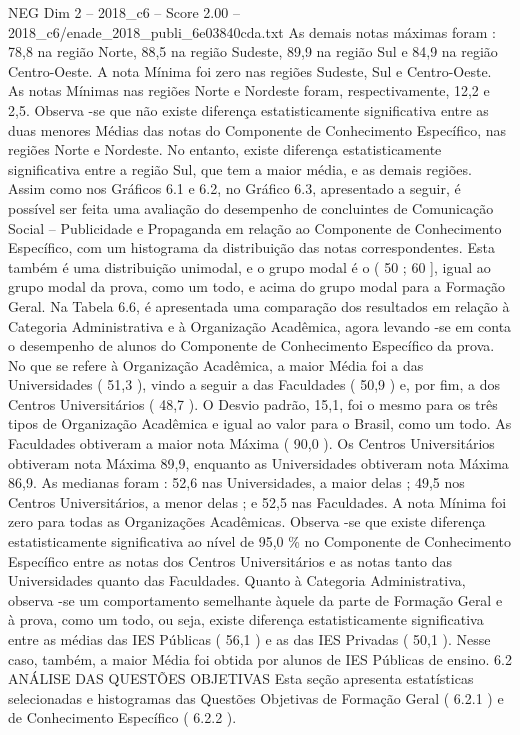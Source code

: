 \begin{textsample}{NEG Dim 2 – 2018\_c6 – Score 2.00 – 2018\_c6/enade\_2018\_publi\_6e03840cda.txt}
As demais notas máximas foram : 78,8 na região Norte, 88,5 na região Sudeste, 89,9 na região Sul e 84,9 na região Centro-Oeste.
A nota Mínima foi zero nas regiões Sudeste, Sul e Centro-Oeste.
As notas Mínimas nas regiões Norte e Nordeste foram, respectivamente, 12,2 e 2,5.
Observa -se que não existe diferença estatisticamente significativa entre as duas menores Médias das notas do Componente de Conhecimento Específico, nas regiões Norte e Nordeste.
No entanto, existe diferença estatisticamente significativa entre a região Sul, que tem a maior média, e as demais regiões.
Assim como nos Gráficos 6.1 e 6.2, no Gráfico 6.3, apresentado a seguir, é possível ser feita uma avaliação do desempenho de concluintes de Comunicação Social – Publicidade e Propaganda em relação ao Componente de Conhecimento Específico, com um histograma da distribuição das notas correspondentes.
Esta também é uma distribuição unimodal, e o grupo modal é o ( 50 ; 60 ], igual ao grupo modal da prova, como um todo, e acima do grupo modal para a Formação Geral.
Na Tabela 6.6, é apresentada uma comparação dos resultados em relação à Categoria Administrativa e à Organização Acadêmica, agora levando -se em conta o desempenho de alunos do Componente de Conhecimento Específico da prova.
No que se refere à Organização Acadêmica, a maior Média foi a das Universidades ( 51,3 ), vindo a seguir a das Faculdades ( 50,9 ) e, por fim, a dos Centros Universitários ( 48,7 ).
O Desvio padrão, 15,1, foi o mesmo para os três tipos de Organização Acadêmica e igual ao valor para o Brasil, como um todo.
As Faculdades obtiveram a maior nota Máxima ( 90,0 ).
Os Centros Universitários obtiveram nota Máxima 89,9, enquanto as Universidades obtiveram nota Máxima 86,9.
As medianas foram : 52,6 nas Universidades, a maior delas ; 49,5 nos Centros Universitários, a menor delas ; e 52,5 nas Faculdades.
A nota Mínima foi zero para todas as Organizações Acadêmicas.
Observa -se que existe diferença estatisticamente significativa ao nível de 95,0 \% no Componente de Conhecimento Específico entre as notas dos Centros Universitários e as notas tanto das Universidades quanto das Faculdades.
Quanto à Categoria Administrativa, observa -se um comportamento semelhante àquele da parte de Formação Geral e à prova, como um todo, ou seja, existe diferença estatisticamente significativa entre as médias das IES Públicas ( 56,1 ) e as das IES Privadas ( 50,1 ).
Nesse caso, também, a maior Média foi obtida por alunos de IES Públicas de ensino. 6.2 ANÁLISE DAS QUESTÕES OBJETIVAS Esta seção apresenta estatísticas selecionadas e histogramas das Questões Objetivas de Formação Geral ( 6.2.1 ) e de Conhecimento Específico ( 6.2.2 ).

\end{textsample}
